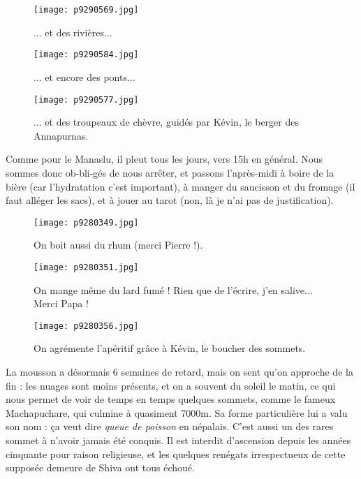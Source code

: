 \documentclass{book}
\begin{document}
\begin{figure}[h]
\centering
\texttt{[image: p9290569.jpg]}
\caption*{... et des rivières...}
\end{figure}


\begin{figure}[h]
\centering
\texttt{[image: p9290584.jpg]}
\caption*{... et encore des ponts...}
\end{figure}


\begin{figure}[h]
\centering
\texttt{[image: p9290577.jpg]}
\caption*{... et des troupeaux de chèvre, guidés par Kévin, le berger des Annapurnas.}
\end{figure}

Comme pour le Manaslu, il pleut tous les jours, vers 15h en général. Nous sommes donc ob-bli-gés de nous arrêter, et passons l'après-midi à boire de la bière (car l'hydratation c'est important), à manger du saucisson et du fromage (il faut alléger les sacs), et à jouer au tarot (non, là je n'ai pas de justification).


\begin{figure}[h]
\centering
\texttt{[image: p9280349.jpg]}
\caption*{On boit aussi du rhum (merci Pierre !).}
\end{figure}


\begin{figure}[h]
\centering
\texttt{[image: p9280351.jpg]}
\caption*{On mange même du lard fumé ! Rien que de l'écrire, j'en salive... Merci Papa !}
\end{figure}


\begin{figure}[h]
\centering
\texttt{[image: p9280356.jpg]}
\caption*{On agrémente l'apéritif grâce à Kévin, le boucher des sommets.}
\end{figure}

La mousson a désormais 6 semaines de retard, mais on sent qu'on approche de la fin : les nuages sont moins présents, et on a souvent du soleil le matin, ce qui nous permet de voir de temps en temps quelques sommets, comme le fameux Machapuchare, qui culmine à quasiment 7000m. Sa forme particulière lui a valu son nom : ça veut dire \emph{queue de poisson} en népalais. C'est aussi un des rares sommet à n'avoir jamais été conquis. Il est interdit d'ascension depuis les années cinquante pour raison religieuse, et les quelques renégats irrespectueux de cette supposée demeure de Shiva ont tous échoué.
\end{document}

